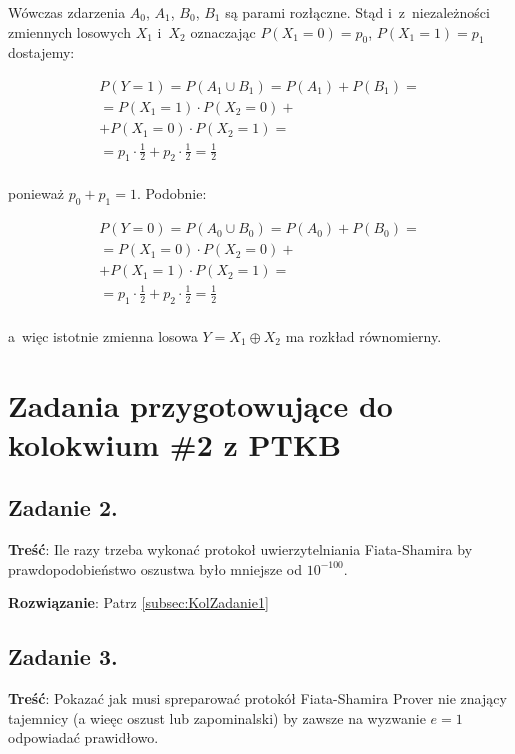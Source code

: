 \documentclass[a4paper,10pt, twocolumn]{article}
\begin{document}
\noindent Wówczas zdarzenia $A_{0}$, $A_{1}$, $B_{0}$, $B_{1}$ są parami rozłączne. Stąd i~z~niezależności zmiennych losowych $X_{1}$ i~$X_{2}$ oznaczając $P(X_{1} = 0) = p_{0}$, $P(X_{1} = 1) = p_{1}$ dostajemy:

\begin{equation*}
 \begin{array}{c} P(Y = 1) = P(A_{1} \cup B_{1}) = P(A_{1}) + P(B_{1}) = \\ = P(X_{1} = 1) \cdot P(X_{2} = 0) + \\ + P(X_{1} = 0) \cdot P(X_{2} = 1) = \\ = p_{1} \cdot \frac{1}{2} + p_{2} \cdot \frac{1}{2} = \frac{1}{2} \\ \end{array}
\end{equation*}

\noindent ponieważ $p_{0} + p_{1} = 1$. Podobnie:

\begin{equation*}
 \begin{array}{c} P(Y = 0) = P(A_{0} \cup B_{0}) = P(A_{0}) + P(B_{0}) = \\ = P(X_{1} = 0) \cdot P(X_{2} = 0) + \\ + P(X_{1} = 1) \cdot P(X_{2} = 1) = \\ = p_{1} \cdot \frac{1}{2} + p_{2} \cdot \frac{1}{2} = \frac{1}{2} \\ \end{array}
\end{equation*}

\noindent a~więc istotnie zmienna losowa $Y = X_{1} \oplus X_{2}$ ma rozkład równomierny.

\section{Zadania przygotowujące do kolokwium \#2 z PTKB}

\subsection{Zadanie 2.}
\textbf{Treść}: Ile razy trzeba wykonać protokoł uwierzytelniania Fiata-Shamira by prawdopodobieństwo oszustwa było mniejsze od $10^{-100}$.

\textbf{Rozwiązanie}: Patrz \ref{subsec:KolZadanie1}

\subsection{Zadanie 3.}
\textbf{Treść}: Pokazać jak musi spreparować protokół Fiata-Shamira Prover nie znający tajemnicy (a wieęc oszust lub zapominalski) by zawsze na wyzwanie $e=1$ odpowiadać prawidłowo.
\end{document}
